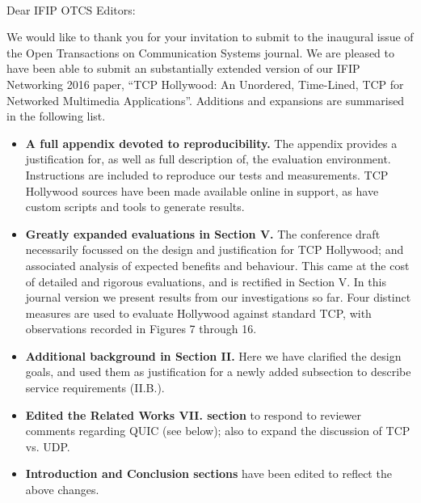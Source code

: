 \documentclass{letter}
\begin{document}
\begin{letter}{~}

\opening{Dear IFIP OTCS Editors:}

We would like to thank you for your invitation to submit to the inaugural
issue of the Open Transactions on Communication Systems journal. We are pleased
to have been able to submit an substantially extended version of our IFIP Networking 2016 paper,
``TCP Hollywood: An Unordered, Time-Lined, TCP for Networked Multimedia Applications''.
Additions and expansions are summarised in the following list.

\begin{itemize}

  \item \textbf{A full appendix devoted to reproducibility.} The appendix
  provides a justification for, as well as full description of, the evaluation
  environment. Instructions are included to reproduce our tests and
  measurements. TCP Hollywood sources have been made available online in
  support, as have custom scripts and tools to generate results.

  \item \textbf{Greatly expanded evaluations in Section V.} The conference draft
  necessarily focussed on the design and justification for TCP Hollywood; and
  associated analysis of expected benefits and behaviour. This came at the cost
  of detailed and rigorous evaluations, and is rectified in Section V. In this
  journal version we present results from our investigations so far. Four
  distinct measures are used to evaluate Hollywood against standard TCP, with
  observations recorded in Figures 7 through 16.

  \item \textbf{Additional background in Section II.} Here we have
  clarified the design goals, and used them as justification for a newly added
  subsection to describe service requirements (II.B.).

  \item \textbf{Edited the Related Works VII. section} to respond to reviewer comments regarding QUIC (see below); also to expand the discussion of TCP vs. UDP.

  \item \textbf{Introduction and Conclusion sections} have been edited to
  reflect the above changes.

\end{itemize}




\end{letter}
\end{document}
